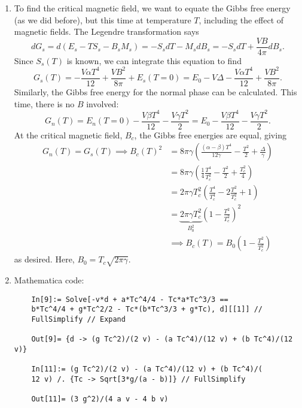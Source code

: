 \documentclass{article}
\theoremstyle{definition}
\newcommand{\al}{\alpha}
\newcommand{\be}{\beta}
\newcommand{\f}[2]{\frac{#1}{#2}}
\newcommand{\lp}{\left(}
\newcommand{\rp}{\right)}
\begin{document}
\begin{enumerate}[label=(\alph*)]
	
	
	
	\item To find the critical magnetic field, we want to equate the Gibbs free energy (as we did before), but this time at temperature $T$, including the effect of magnetic fields. The Legendre transformation says 
	\begin{equation*}
	dG_s = d(E_s-TS_s-B_sM_s) = -S_sdT - M_sdB_s = -S_sdT + \f{VB}{4\pi}dB_s.
	\end{equation*}
	Since $S_s(T)$ is known, we can integrate this equation to find 
	\begin{equation*}
	G_s(T) = -\f{V\al T^4}{12} + \f{VB^2}{8\pi} + E_s(T=0) = E_0 - V\Delta -\f{V\al T^4}{12} + \f{VB^2}{8\pi}.
	\end{equation*}
	Similarly, the Gibbs free energy for the normal phase can be calculated. This time, there is no $B$ involved:
	\begin{equation*}
	G_n(T) = E_n(T=0) - \f{V\be T^4}{12} - \f{V\gamma T^2}{2} = E_0 - \f{V\be T^4}{12} - \f{V\gamma T^2}{2}.
	\end{equation*}
	At the critical magnetic field, $B_c$, the Gibbs free energies are equal, giving 
	\begin{align*}
	G_n(T) = G_s(T) \implies 
	B_c(T)^2 &= 8\pi \gamma \lp \f{(\al-\be)T^4}{12\gamma} - \f{ T^2}{2} + \f{\Delta}{\gamma}  \rp\\
	&= 8\pi \gamma \lp \f{1}{4}\f{T^4}{T_c^2} - \f{T^2}{2} + \f{T_c^2}{4} \rp \\
	&= 2\pi \gamma T_c^2\lp \f{T^4}{T_c^4} - 2\f{T^2}{T_c^2}+ 1 \rp \\
	&= \underbrace{2\pi \gamma T_c^2}_{B_0^2} \lp 1 -  \f{T^2}{T_c^2} \rp^2 \\
	&\implies \boxed{B_c(T) = B_0 \lp 1 - \f{T^2}{T_c^2} \rp}
	\end{align*}
	as desired. Here, $B_0 = T_c \sqrt{2\pi \gamma}$.
	
	
	\item Mathematica code:
	\begin{lstlisting}
	In[9]:= Solve[-v*d + a*Tc^4/4 - Tc*a*Tc^3/3 == 
	b*Tc^4/4 + g*Tc^2/2 - Tc*(b*Tc^3/3 + g*Tc), d][[1]] // 
	FullSimplify // Expand
	
	Out[9]= {d -> (g Tc^2)/(2 v) - (a Tc^4)/(12 v) + (b Tc^4)/(12 v)}
	
	In[11]:= (g Tc^2)/(2 v) - (a Tc^4)/(12 v) + (b Tc^4)/(
	12 v) /. {Tc -> Sqrt[3*g/(a - b)]} // FullSimplify
	
	Out[11]= (3 g^2)/(4 a v - 4 b v)
	\end{lstlisting}
	

	
\end{enumerate}
\end{document}
